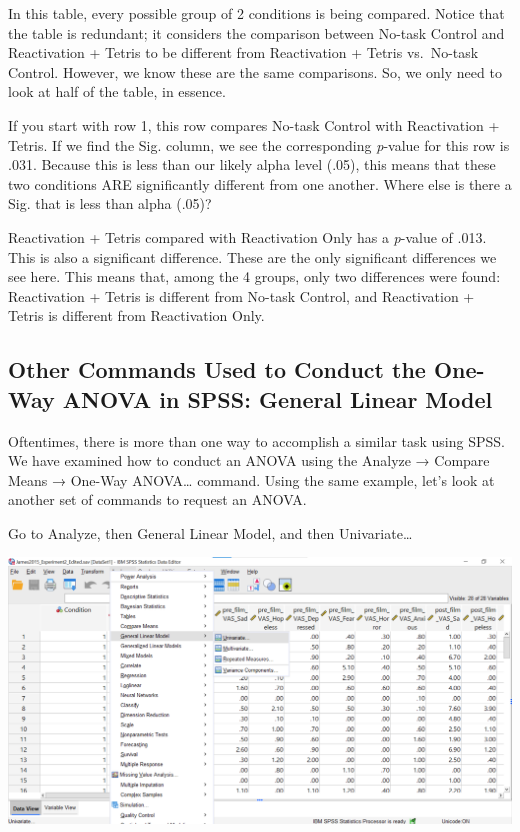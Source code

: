 \documentclass[
]{book}
\begin{document}
In this table, every possible group of 2 conditions is being compared. Notice that the table is redundant; it considers the comparison between No-task Control and Reactivation + Tetris to be different from Reactivation + Tetris vs.~No-task Control. However, we know these are the same comparisons. So, we only need to look at half of the table, in essence.

If you start with row 1, this row compares No-task Control with Reactivation + Tetris. If we find the Sig. column, we see the corresponding \emph{p}-value for this row is .031. Because this is less than our likely alpha level (.05), this means that these two conditions ARE significantly different from one another. Where else is there a Sig. that is less than alpha (.05)?

Reactivation + Tetris compared with Reactivation Only has a \emph{p}-value of .013. This is also a significant difference. These are the only significant differences we see here. This means that, among the 4 groups, only two differences were found: Reactivation + Tetris is different from No-task Control, and Reactivation + Tetris is different from Reactivation Only.

\hypertarget{other-commands-used-to-conduct-the-one-way-anova-in-spss-general-linear-model}{%
\subsection{Other Commands Used to Conduct the One-Way ANOVA in SPSS: General Linear Model}\label{other-commands-used-to-conduct-the-one-way-anova-in-spss-general-linear-model}}

Oftentimes, there is more than one way to accomplish a similar task using SPSS. We have examined how to conduct an ANOVA using the {Analyze} → {Compare Means} → {One-Way ANOVA\ldots{}} command. Using the same example, let's look at another set of commands to request an ANOVA.

Go to {Analyze}, then { General Linear Model}, and then {Univariate\ldots{}}

\includegraphics{img/8.6.6.34.png}
\end{document}
